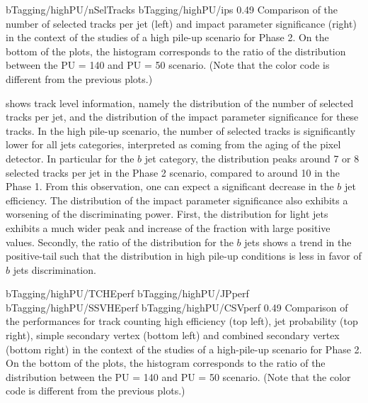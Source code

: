                      {bTagging/highPU/nSelTracks}
                     {bTagging/highPU/ips}
                     {0.49}
                     {Comparison of the number of selected tracks per jet (left) and
                     impact parameter significance (right) in the context of the
                     studies of a high pile-up scenario for Phase 2.
                     On the bottom of the plots, the histogram corresponds
                     to the ratio of the distribution between the PU = 140 and PU = 50
                     scenario.
                     (Note that the color code is different from the previous plots.)
                     }

     shows track level information, namely the
    distribution of the number of selected tracks per jet, and the distribution of the
    impact parameter significance for these tracks. In the high pile-up scenario, the
    number of selected tracks is significantly lower for all jets categories, interpreted
    as coming from the aging of the pixel detector. In particular
    for the $b$ jet category, the distribution peaks around 7 or 8 selected tracks per
    jet in the Phase 2 scenario, compared to around 10 in the Phase 1. From this observation, one
    can expect a significant decrease in the $b$ jet efficiency. The distribution of
    the impact parameter significance also exhibits a worsening of the discriminating
    power. First, the distribution for light jets exhibits a much wider peak and
    increase of the fraction with large positive values. Secondly, the ratio of the
    distribution for the $b$ jets shows a trend in the positive-tail such that the
    distribution in high pile-up conditions is less in favor of $b$ jets discrimination.

                      {bTagging/highPU/TCHEperf}
                      {bTagging/highPU/JPperf}
                      {bTagging/highPU/SSVHEperf}
                      {bTagging/highPU/CSVperf}
                      {0.49}
                      {Comparison of the performances for track counting high efficiency
                      (top left), jet probability (top right), simple secondary vertex
                      (bottom left) and combined secondary vertex
                      (bottom right) in the context of the studies of a high-pile-up
                      scenario for Phase 2. On the bottom of the plots, the histogram corresponds
                      to the ratio of the distribution between the PU = 140 and PU = 50
                      scenario. (Note that the color code is different from the previous plots.) }

